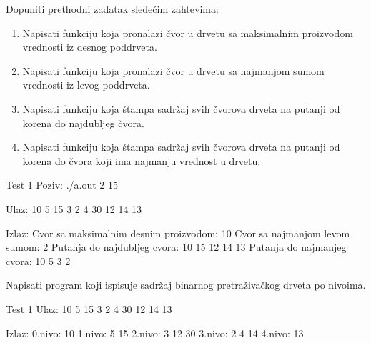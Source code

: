 \begin{Exercise}[label=711]
Dopuniti prethodni zadatak sledećim zahtevima:
\begin{enumerate}
\item Napisati funkciju koja pronalazi čvor u drvetu sa maksimalnim proizvodom vrednosti iz desnog poddrveta.
\item Napisati funkciju koja pronalazi čvor u drvetu sa najmanjom sumom vrednosti iz levog poddrveta.
\item Napisati funkciju  koja štampa sadržaj svih čvorova drveta na putanji od korena do najdubljeg čvora.
\item Napisati funkciju koja štampa sadržaj svih čvorova drveta na putanji od korena do čvora koji ima najmanju vrednost u drvetu.
\end{enumerate}

\begin{maxitest}
\begin{test}{Test 1}
Poziv: ./a.out 2 15

Ulaz: 
10 5 15 3 2 4 30 12 14 13

Izlaz: 
Cvor sa maksimalnim desnim proizvodom: 10
Cvor sa najmanjom levom sumom: 2
Putanja do najdubljeg cvora: 10 15 12 14 13
Putanja do najmanjeg cvora: 10 5 3 2
\end{test}
\end{maxitest}

\end{Exercise}


\begin{Exercise}[label=712]
Napisati program koji ispisuje sadržaj binarnog pretraživačkog drveta po nivoima. 

\begin{maxitest}
\begin{test}{Test 1}
Ulaz: 
10 5 15 3 2 4 30 12 14 13

Izlaz: 
0.nivo: 10
1.nivo: 5 15
2.nivo: 3 12 30
3.nivo: 2 4 14
4.nivo: 13
\end{test}
\end{maxitest}

\end{Exercise}


